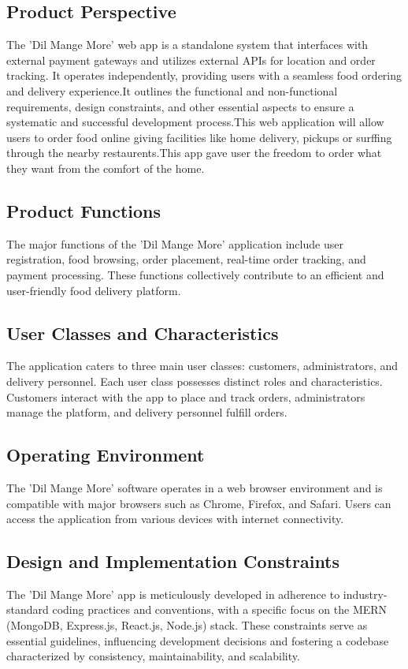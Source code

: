 \documentclass{article}
\begin{document}
\subsection{Product Perspective}
The 'Dil Mange More' web app is a standalone system that interfaces with external payment gateways and utilizes external APIs for location and order tracking. It operates independently, providing users with a seamless food ordering and delivery experience.It outlines the functional and non-functional requirements, design constraints, and other essential aspects to ensure a systematic and successful development process.This web application will allow users to order food online giving facilities like home delivery, pickups or surffing through the nearby restaurents.This app gave user the freedom to order what they want from the comfort of the home.

\subsection{Product Functions}
The major functions of the 'Dil Mange More' application include user registration, food browsing, order placement, real-time order tracking, and payment processing. These functions collectively contribute to an efficient and user-friendly food delivery platform.

\subsection{User Classes and Characteristics}
The application caters to three main user classes: customers, administrators, and delivery personnel. Each user class possesses distinct roles and characteristics. Customers interact with the app to place and track orders, administrators manage the platform, and delivery personnel fulfill orders.

\subsection{Operating Environment}
The 'Dil Mange More' software operates in a web browser environment and is compatible with major browsers such as Chrome, Firefox, and Safari. Users can access the application from various devices with internet connectivity.

\subsection{Design and Implementation Constraints}
The 'Dil Mange More' app is meticulously developed in adherence to industry-standard coding practices and conventions, with a specific focus on the MERN (MongoDB, Express.js, React.js, Node.js) stack. These constraints serve as essential guidelines, influencing development decisions and fostering a codebase characterized by consistency, maintainability, and scalability.
\end{document}
